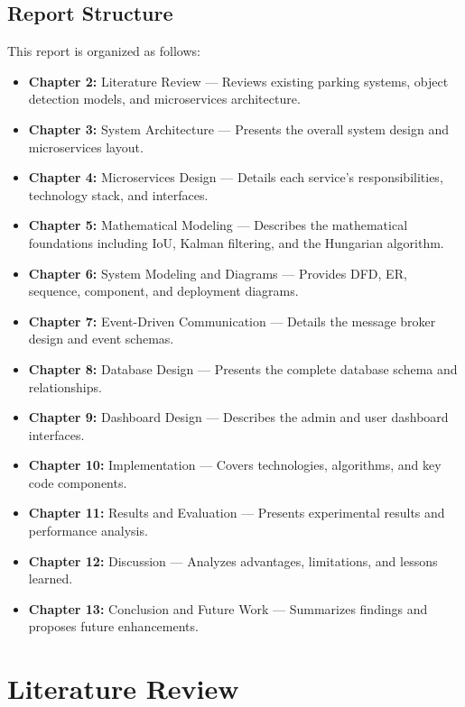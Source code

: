 \documentclass[12pt,a4paper]{report}
\begin{document}
\section{Report Structure}

This report is organized as follows:

\begin{itemize}
    \item \textbf{Chapter 2:} Literature Review --- Reviews existing parking systems, object detection models, and microservices architecture.
    \item \textbf{Chapter 3:} System Architecture --- Presents the overall system design and microservices layout.
    \item \textbf{Chapter 4:} Microservices Design --- Details each service's responsibilities, technology stack, and interfaces.
    \item \textbf{Chapter 5:} Mathematical Modeling --- Describes the mathematical foundations including IoU, Kalman filtering, and the Hungarian algorithm.
    \item \textbf{Chapter 6:} System Modeling and Diagrams --- Provides DFD, ER, sequence, component, and deployment diagrams.
    \item \textbf{Chapter 7:} Event-Driven Communication --- Details the message broker design and event schemas.
    \item \textbf{Chapter 8:} Database Design --- Presents the complete database schema and relationships.
    \item \textbf{Chapter 9:} Dashboard Design --- Describes the admin and user dashboard interfaces.
    \item \textbf{Chapter 10:} Implementation --- Covers technologies, algorithms, and key code components.
    \item \textbf{Chapter 11:} Results and Evaluation --- Presents experimental results and performance analysis.
    \item \textbf{Chapter 12:} Discussion --- Analyzes advantages, limitations, and lessons learned.
    \item \textbf{Chapter 13:} Conclusion and Future Work --- Summarizes findings and proposes future enhancements.
\end{itemize}


\chapter{Literature Review}
\end{document}

